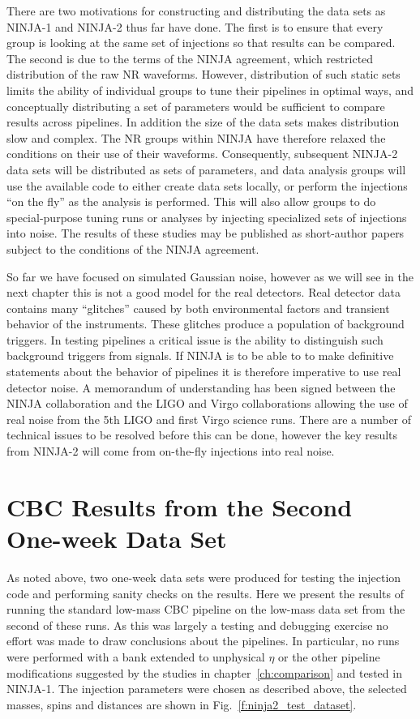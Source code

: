 There are two motivations for constructing and distributing the data
sets as NINJA-1 and NINJA-2 thus far have done.  The first is to
ensure that every group is looking at the same set of injections so
that results can be compared.  The second is due to the terms of the
NINJA agreement, which restricted distribution of the raw NR
waveforms.  However, distribution of such static sets limits the
ability of individual groups to tune their pipelines in optimal ways,
and conceptually distributing a set of parameters would be sufficient
to compare results across pipelines.  In addition the size of the data
sets makes distribution slow and complex.  The NR groups within NINJA
have therefore relaxed the conditions on their use of their waveforms.
Consequently, subsequent NINJA-2 data sets will be distributed as sets
of parameters, and data analysis groups will use the available code to
either create data sets locally, or perform the injections ``on the
fly'' as the analysis is performed.  This will also allow groups to do
special-purpose tuning runs or analyses by injecting specialized 
sets of injections into noise.  The results of these studies may be
published as short-author papers subject to the conditions of the
NINJA agreement.

So far we have focused on simulated Gaussian noise, however as we will
see in the next chapter this is not a good model for the real
detectors.  Real detector data contains many ``glitches'' caused by
both environmental factors and transient behavior of the instruments.
These glitches produce a population of background triggers.  In
testing pipelines a critical issue is the ability to distinguish such
background triggers from signals.  If NINJA is to be able to to make
definitive statements about the behavior of pipelines it is therefore
imperative to use real detector noise.  A memorandum of understanding
has been signed between the NINJA collaboration and the LIGO and Virgo
collaborations allowing the use of real noise from the 5th LIGO and
first Virgo science runs.  There are a number of technical issues to
be resolved before this can be done, however the key results from
NINJA-2 will come from on-the-fly injections into real noise.

\section{CBC Results from the Second One-week Data Set}
\label{sec:ninja2_test_week}

As noted above, two one-week data sets were produced for testing the
injection code and performing sanity checks on the results.  Here we
present the results of running the standard low-mass CBC pipeline on
the low-mass data set from the second of these runs.  As this was
largely a testing and debugging exercise no effort was made to draw
conclusions about the pipelines.  In particular, no runs were
performed with a bank extended to unphysical $\eta$ or the other
pipeline modifications suggested by the studies in
chapter~\ref{ch:comparison} and tested in NINJA-1.  The injection
parameters were chosen as described above, the selected masses, spins
and distances are shown in Fig.~\ref{f:ninja2_test_dataset}.

